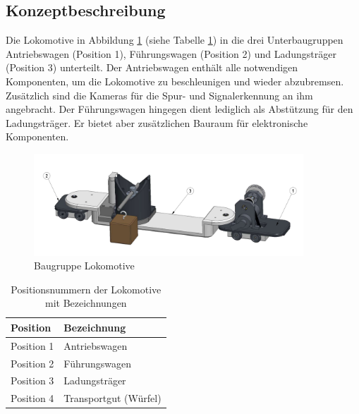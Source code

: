 \documentclass[../../main.tex]{subfiles}
\begin{document}
    \subsection{Konzeptbeschreibung}
    Die Lokomotive in Abbildung \ref{fig:bg_lokomotive} (siehe Tabelle \ref{tab:bg_lokomotive}) in die drei Unterbaugruppen Antriebswagen (Position 1), Führungswagen (Position 2) und Ladungsträger (Position 3) unterteilt. Der Antriebswagen enthält alle notwendigen Komponenten, um die Lokomotive zu beschleunigen und wieder abzubremsen. Zusätzlich sind die Kameras für die Spur- und Signalerkennung an ihm angebracht. Der Führungswagen hingegen dient lediglich als Abstützung für den Ladungsträger. Er bietet aber zusätzlichen Bauraum für elektronische Komponenten.\\

    \begin{figure}[H] %
        \centering
        \includegraphics[width=0.9\textwidth]{Lokomotive.png}
        \caption{Baugruppe Lokomotive}
        \label{fig:bg_lokomotive}
    \end{figure}

    \begin{table}[H] \centering
        \begin{tabular}{|l|l|}
        \hline
        \textbf{Position} & \textbf{Bezeichnung}\\
        \hline
        Position 1          & Antriebswagen\\
         \hline
        Position 2          & Führungswagen\\
        \hline
        Position 3          & Ladungsträger\\
        \hline
        Position 4          & Transportgut (Würfel)\\
        \hline
        \end{tabular}

        \caption{Positionsnummern der Lokomotive mit Bezeichnungen}
        \label{tab:bg_lokomotive}
    \end{table}
\end{document}
